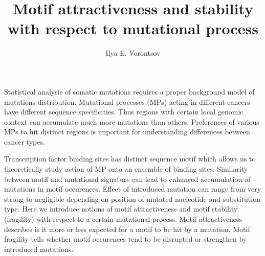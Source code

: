 \documentclass[a4paper]{article}
\begin{document}
\title{Motif attractiveness and stability with respect to mutational process}
\author{Ilya E. Vorontsov}
\maketitle


Statistical analysis of somatic mutations requires a proper background model of mutations distribution. 
Mutational processes (MPs) acting in different cancers have different sequence specificities. Thus regions with certain local genomic context can accumulate much more mutations than others. Preferences of various MPs to hit distinct regions is important for understanding differences between cancer types.

Transcription factor binding sites has distinct sequence motif which allows us to theoretically study action of MP onto an ensemble of binding sites. Similarity between motif and mutational signature can lead to enhanced accumulation of mutations in motif occurences. Effect of introduced mutation can range from very strong to negligible depending on position of mutated nucleotide and substitution type.
Here we introduce notions of motif attractiveness and motif stability (fragility) with respect to a certain mutational process. Motif attractiveness describes is it more or less expected for a motif to be hit by a mutation. Motif fragility tells whether motif occurences tend to be disrupted or strengthen by introduced mutations.


\end{document}
